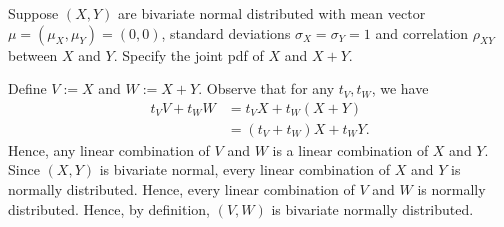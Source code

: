 \begin{exercise}
Suppose $(X,Y)$ are bivariate normal distributed with mean vector $\mu = (\mu_X, \mu_Y) = (0,0)$, standard deviations $\sigma_X = \sigma_Y = 1$ and correlation $\rho_{XY}$ between $X$ and $Y$. Specify the joint pdf of $X$ and $X + Y$.
\begin{solution}
Define $V := X$ and $W := X + Y$. Observe that for any $t_V, t_W$, we have
\begin{align}
    t_V V + t_W W &= t_V X + t_W (X + Y) \\
    &= (t_V + t_W) X + t_W Y.
\end{align}
Hence, any linear combination of $V$ and $W$ is a linear combination of $X$ and $Y$. Since $(X,Y)$ is bivariate normal, every linear combination of $X$ and $Y$ is normally distributed. Hence, every linear combination of $V$ and $W$ is normally distributed. Hence, by definition, $(V,W)$ is bivariate normally distributed.


\end{solution}
\end{exercise}

